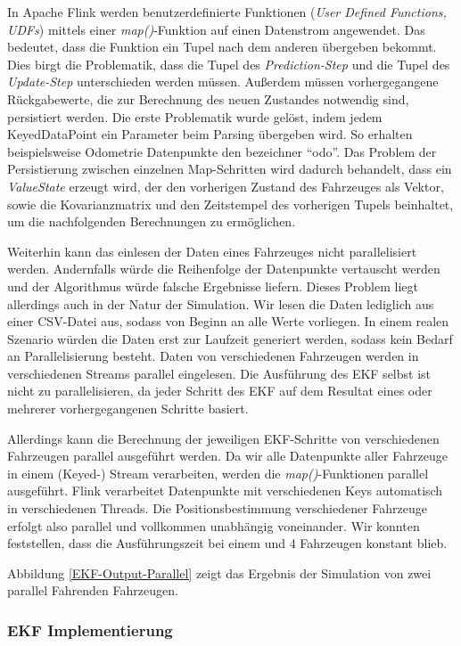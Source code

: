 \documentclass[11pt]{article}
\begin{document}
In Apache Flink werden benutzerdefinierte Funktionen (\textit{User Defined Functions, UDFs}) mittels einer \textit{map()}-Funktion auf einen Datenstrom angewendet. Das bedeutet, dass die Funktion ein Tupel nach dem anderen übergeben bekommt. Dies birgt die Problematik, dass die Tupel des \textit{Prediction-Step} und die Tupel des \textit{Update-Step} unterschieden werden müssen. Außerdem  müssen vorhergegangene Rückgabewerte, die zur Berechnung des neuen Zustandes notwendig sind, persistiert werden. Die erste Problematik wurde gelöst, indem jedem KeyedDataPoint ein Parameter beim Parsing übergeben wird. So erhalten beispielsweise Odometrie Datenpunkte den bezeichner “odo”. Das Problem der Persistierung zwischen einzelnen Map-Schritten wird dadurch behandelt, dass ein \textit{ValueState} erzeugt wird, der den vorherigen Zustand des Fahrzeuges als Vektor, sowie die Kovarianzmatrix und den Zeitstempel des vorherigen Tupels beinhaltet, um die nachfolgenden Berechnungen zu ermöglichen.

Weiterhin kann das einlesen der Daten eines Fahrzeuges nicht parallelisiert werden. Andernfalls würde die Reihenfolge der Datenpunkte vertauscht werden und der Algorithmus würde falsche Ergebnisse liefern. Dieses Problem liegt allerdings auch in der Natur der Simulation. Wir lesen die Daten lediglich aus einer CSV-Datei aus, sodass von Beginn an alle Werte vorliegen. In einem realen Szenario würden die Daten erst zur Laufzeit generiert werden, sodass kein Bedarf an Parallelisierung besteht. Daten von verschiedenen Fahrzeugen werden in verschiedenen Streams parallel eingelesen. Die Ausführung des EKF selbst ist nicht zu parallelisieren, da jeder Schritt des EKF auf dem Resultat eines oder mehrerer vorhergegangenen Schritte basiert.

Allerdings kann die Berechnung der jeweiligen EKF-Schritte von verschiedenen Fahrzeugen parallel ausgeführt werden. Da wir alle Datenpunkte aller Fahrzeuge in einem (Keyed-) Stream verarbeiten, werden die \textit{map()}-Funktionen parallel ausgeführt. Flink verarbeitet Datenpunkte mit verschiedenen Keys automatisch in verschiedenen Threads. Die Positionsbestimmung verschiedener Fahrzeuge erfolgt also parallel und vollkommen unabhängig voneinander. Wir konnten feststellen, dass die Ausführungszeit bei einem und 4 Fahrzeugen konstant blieb.

Abbildung \ref{EKF-Output-Parallel} zeigt das Ergebnis der Simulation von zwei parallel Fahrenden Fahrzeugen.




\subsubsection{EKF Implementierung}\label{EKF-Implementierung}
\end{document}
